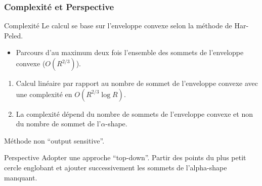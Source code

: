 \begin{frame}
\frametitle{Complexité et Perspective}

\begin{block}{ Complexité}
  Le calcul se base sur l'enveloppe convexe selon la méthode de Har-Peled. 
  \begin{itemize}
    \item Parcours d'au maximum deux fois l'ensemble des sommets de l'enveloppe convexe ($O(R^{2/3})$). 
  \end{itemize}
  
  \begin{enumerate}
    \item Calcul linéaire par rapport au nombre de sommet de l'enveloppe convexe avec une complexité en $O(R^{2/3} \log R )$.
    \item La complexité dépend du nombre de sommets de l'enveloppe convexe et non du nombre de sommet de l'$\alpha$-shape.\\
  \end{enumerate}
  \alert{Méthode non ``output sensitive''.} 
\end{block}

\begin{block}{Perspective}
  Adopter une approche ``top-down''. 
  Partir des points du plus petit cercle englobant et ajouter successivement les sommets de l'alpha-shape manquant. 
\end{block}
\end{frame}


